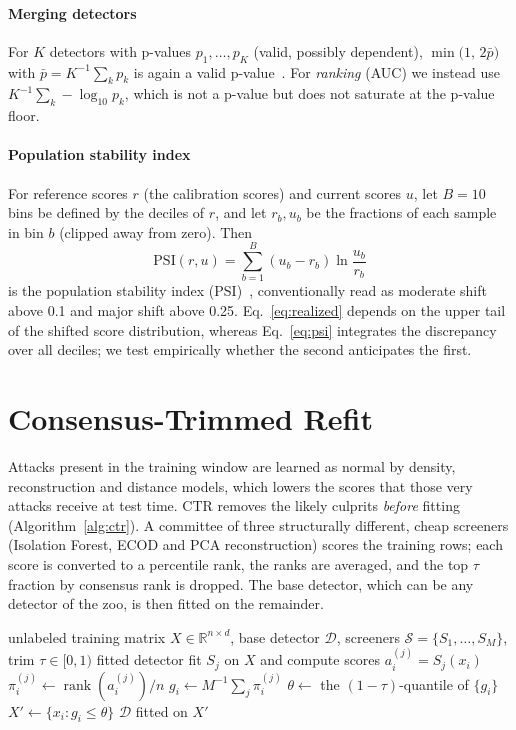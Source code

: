 \documentclass[journal]{IEEEtran}
\newcommand{\PSI}{\mathrm{PSI}}
\begin{document}
\paragraph*{Merging detectors}
For $K$ detectors with p-values $p_1,\dots,p_K$ (valid, possibly dependent), $\min\!\big(1,\,2\bar p\big)$ with $\bar p=K^{-1}\sum_k p_k$ is again a valid p-value~\cite{vovk2020}. For \emph{ranking} (AUC) we instead use $K^{-1}\sum_k -\log_{10}p_k$, which is not a p-value but does not saturate at the p-value floor.

\paragraph*{Population stability index}
For reference scores $r$ (the calibration scores) and current scores $u$, let $B=10$ bins be defined by the deciles of $r$, and let $r_b,u_b$ be the fractions of each sample in bin $b$ (clipped away from zero). Then
\begin{equation}
\PSI(r,u)=\sum_{b=1}^{B}(u_b-r_b)\ln\frac{u_b}{r_b}
\label{eq:psi}
\end{equation}
is the population stability index (PSI)~\cite{siddiqi2006}, conventionally read as moderate shift above 0.1 and major shift above 0.25. Eq.~\ref{eq:realized} depends on the upper tail of the shifted score distribution, whereas Eq.~\ref{eq:psi} integrates the discrepancy over all deciles; we test empirically whether the second anticipates the first.

\section{Consensus-Trimmed Refit}
\label{sec:ctr}
Attacks present in the training window are learned as normal by density, reconstruction and distance models, which lowers the scores that those very attacks receive at test time. CTR removes the likely culprits \emph{before} fitting (Algorithm~\ref{alg:ctr}). A committee of three structurally different, cheap screeners (Isolation Forest, ECOD and PCA reconstruction) scores the training rows; each score is converted to a percentile rank, the ranks are averaged, and the top $\tau$ fraction by consensus rank is dropped. The base detector, which can be any detector of the zoo, is then fitted on the remainder.

\begin{algorithm}[t]
\caption{Consensus-Trimmed Refit}
\label{alg:ctr}
\begin{algorithmic}[1]
\Require unlabeled training matrix $X\in\mathbb{R}^{n\times d}$, base detector $\mathcal{D}$, screeners $\mathcal{S}=\{S_1,\dots,S_M\}$, trim $\tau\in[0,1)$
\Ensure fitted detector
  \State fit $S_j$ on $X$ and compute scores $a^{(j)}_i=S_j(x_i)$
  \State $\pi^{(j)}_i\gets \operatorname{rank}(a^{(j)}_i)/n$ \Comment{percentile rank in $(0,1]$}
\EndFor
\State $g_i\gets M^{-1}\sum_{j}\pi^{(j)}_i$ 
\State $\theta\gets$ the $(1-\tau)$-quantile of $\{g_i\}$
\State $X'\gets\{x_i: g_i\le\theta\}$
\State \Return $\mathcal{D}$ fitted on $X'$
\end{algorithmic}
\end{algorithm}
\end{document}
